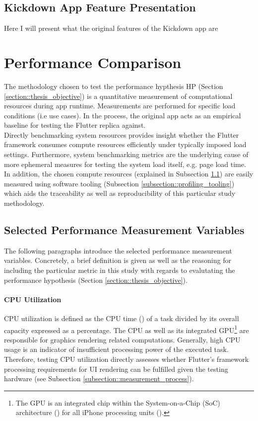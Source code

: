 \subsection{Kickdown App Feature Presentation} \label{section:kickdown_feature_presentation}
Here I will present what the original features of the Kickdown app are

\section{Performance Comparison} \label{section::performance_comparison_design}
The methodology chosen to test the performance hypthesis HP (Section \ref{section::thesis_objective}) is a quantitative
measurement of computational resources during app runtime. Measurements are performed for
specific load conditions (i.e use cases). In the process, the original app acts as an empirical
baseline for testing the Flutter replica against.\\
Directly benchmarking system resources provides insight whether the Flutter framework consumes
compute resources efficiently under typically imposed load settings. Furthermore, system
benchmarking metrics are the underlying cause of more ephemeral measures for testing the
system load itself, e.g. page load time. In addition, the chosen compute resources (explained
in Subsection \ref{subsection::selected_measurement_variables}) are easily measured using software tooling (Subsection \ref{subsection::profiling_tooling}) which aids the
traceability as well as reproducibility of this particular study methodology.

\subsection{Selected Performance Measurement Variables} \label{subsection::selected_measurement_variables}
The following paragraphs introduce the selected performance measurement variables. Concretely,
a brief definition is given as well as the reasoning for including the particular metric in
this study with regards to evalutating the performance hypothesis (Section \ref{section::thesis_objective}).

\paragraph*{CPU Utilization}\label{paragraph::cpu_utilization}\hfill \break
CPU utilization is defined as the CPU time (\cite{FSF1988}) of a task
divided by its overall capacity expressed as a percentage. The CPU as well as its integrated GPU\footnote{The GPU is an integrated chip within the System-on-a-Chip (SoC) architecture (\cite{Martin2001}) for all
iPhone processing units (\cite{WikiChip2020}).}
are responsible for graphics rendering related computations. Generally, high CPU usage is an
indicator of insufficient processing power of the executed task. Therefore, testing CPU utilization
directly assesses whether Flutter’s framework processing requirements for UI rendering can be
fulfilled given the testing hardware (see Subsection \ref{subsection::measurement_process}).

